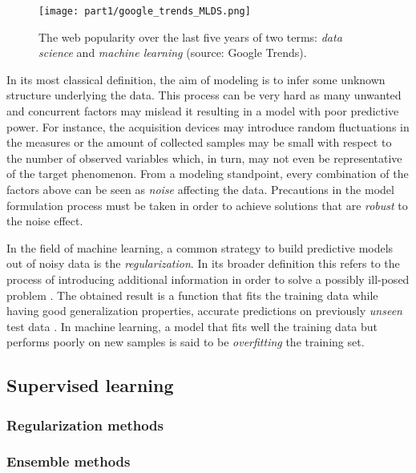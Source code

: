 \begin{figure}
  \centering
    \texttt{[image: part1/google\_trends\_MLDS.png]}
  \caption{The web popularity over the last five years of two terms: \textit{data science} and \textit{machine learning} (source: Google Trends).} \label{fig:google_trend_ML}
\end{figure}


In its most classical definition, the aim of modeling is to infer some unknown structure underlying the data. This process can be very hard as many unwanted and concurrent factors may mislead it resulting in a model with poor predictive power.  For instance, the acquisition devices may introduce random fluctuations in the measures or the amount of collected samples may be small with respect to the number of observed variables which, in turn, may not even be representative of the target phenomenon. From a modeling standpoint, every combination of the factors above can be seen as \textit{noise} affecting the data.
Precautions in the model formulation process must be taken in order to achieve solutions that are \textit{robust} to the noise effect.


In the field of machine learning, a common strategy to build predictive models out of noisy data is the \textit{regularization}.
In its broader definition this refers to the process of introducing additional information in order to solve a possibly ill-posed
problem \cite{tikhonov1963solution, evgeniou2000regularization}. The obtained result is a function that fits the training data while having good generalization properties, \ie accurate predictions on previously  \textit{unseen} test data \cite{hastie2009elements}. In machine learning, a model that fits well the training data but performs poorly on new samples is said to be \textit{overfitting} the training set.

  \subsection{Supervised learning} \label{subsec:supervised_learning}
    \subsubsection{Regularization methods}
    \subsubsection{Ensemble methods}
